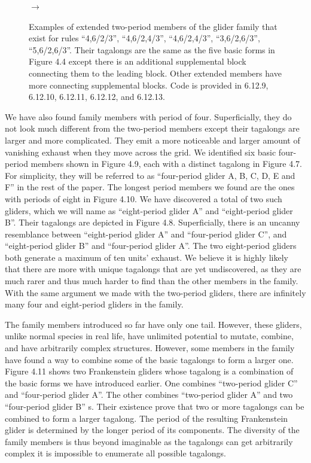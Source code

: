 \documentclass[12pt]{article}
\numberwithin{figure}{section} %
\begin{document}
\begin{figure}[H]
\begin{subfigure}{0.3\textwidth}
     \subcaption{}
   \end{subfigure}
      {\LARGE$\xrightarrow{}$}
   \setcounter{subfigure}{0}
   \caption{Examples of extended two-period members of the glider family that exist for rules “4,6/2/3”, “4,6/2,4/3”, “4,6/2,4/3”, “3,6/2,6/3”, “5,6/2,6/3”. Their tagalongs are the same as the five basic forms in Figure 4.4 except there is an additional supplemental block connecting them to the leading block. Other extended members have more connecting supplemental blocks. Code is provided in 6.12.9, 6.12.10, 6.12.11, 6.12.12, and 6.12.13. }
   \vspace{-1.5em}
\end{figure}
We have also found family members with period of four. Superficially, they do not look much different from the two-period members except their tagalongs are larger and more complicated. They emit a more noticeable and larger amount of vanishing exhaust when they move across the grid. We identified six basic four-period members shown in Figure 4.9, each with a distinct tagalong in Figure 4.7. For simplicity, they will be referred to as “four-period glider A, B, C, D, E and F” in the rest of the paper. The longest period members we found are the ones with periods of eight in Figure 4.10. We have discovered a total of two such gliders, which we will name as “eight-period glider A” and “eight-period glider B”. Their tagalongs are depicted in Figure 4.8. Superficially, there is an uncanny resemblance between “eight-period glider A” and “four-period glider C”, and “eight-period glider B” and “four-period glider A”. The two eight-period gliders both generate a maximum of ten units’ exhaust. We believe it is highly likely that there are more with unique tagalongs that are yet undiscovered, as they are much rarer and thus much harder to find than the other members in the family. With the same argument we made with the two-period gliders, there are infinitely many four and eight-period gliders in the family. 

The family members introduced so far have only one tail. However, these gliders, unlike normal species in real life, have unlimited potential to mutate, combine, and have arbitrarily complex structures. However, some members in the family have found a way to combine some of the basic tagalongs to form a larger one. Figure 4.11 shows two Frankenstein gliders whose tagalong is a combination of the basic forms we have introduced earlier. One combines “two-period glider C” and “four-period glider A”. The other combines “two-period glider A” and two “four-period glider B” s. Their existence prove that two or more tagalongs can be combined to form a larger tagalong. The period of the resulting Frankenstein glider is determined by the longer period of its components. The diversity of the family members is thus beyond imaginable as the tagalongs can get arbitrarily complex it is impossible to enumerate all possible tagalongs. 
\end{document}
